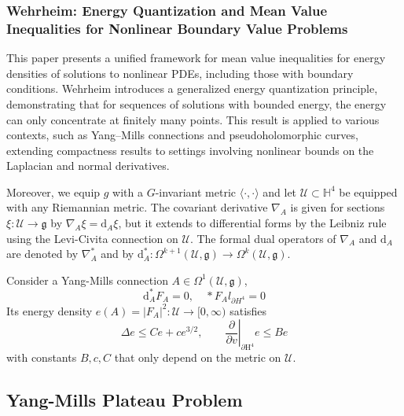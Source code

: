 \documentclass[10pt, letterpaper]{article}
\begin{document}
\subsubsection{Wehrheim: Energy Quantization and Mean Value Inequalities for Nonlinear Boundary Value Problems \cite{wehrheim2005energy}} 
This paper presents a unified framework for mean value inequalities for energy densities of solutions to nonlinear PDEs, including those with boundary conditions. Wehrheim introduces a generalized energy quantization principle, demonstrating that for sequences of solutions with bounded energy, the energy can only concentrate at finitely many points. This result is applied to various contexts, such as Yang–Mills connections and pseudoholomorphic curves, extending compactness results to settings involving nonlinear bounds on the Laplacian and normal derivatives.

{\small
Moreover, we equip $g$ with a $G$-invariant metric $\langle\cdot, \cdot\rangle$ and let $\mathcal{U}\subset \mathbb{H}^4$ be equipped with any Riemannian metric. The covariant derivative $\nabla_A$ is given for sections $\xi: \mathcal{U} \rightarrow \mathfrak{g}$ by $\nabla_A \xi=\mathrm{d}_A \xi$, but it extends to differential forms by the Leibniz rule using the Levi-Civita connection on $\mathcal{U}$. The formal dual operators of $\nabla_A$ and $\mathrm{d}_A$ are denoted by $\nabla_A^*$ and by $\mathrm{d}_A^*: \Omega^{k+1}(\mathcal{U}, \mathfrak{g}) \rightarrow \Omega^k(\mathcal{U}, \mathfrak{g})$.

\begin{lemma}[Lemma A.2.]
Consider a Yang-Mills connection $A \in \Omega^1(\mathcal{U}, \mathfrak{g})$,
$$
\mathrm{d}_A^* F_A=0, \quad * F_A l_{\partial H^4}=0
$$
Its energy density $e(A)=\left|F_A\right|^2: \mathcal{U} \rightarrow[0, \infty)$ satisfies
$$
\Delta e \leq C e+c e^{3 / 2},\left.\quad \quad \frac{\partial}{\partial v}\right|_{\partial \mathrm{H}^4} e \leq B e
$$
with constants $B, c, C$ that only depend on the metric on $\mathcal{U}$.
\end{lemma} 
}

\vspace{1cm}

\subsection{Yang-Mills Plateau Problem}
\end{document}
